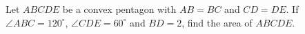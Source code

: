 Let $ABCDE$ be a convex pentagon with $AB=BC$ and $CD=DE$. If $\angle ABC=120^\circ$, $\angle CDE=60^\circ$ and $BD=2$, find the area of $ABCDE$.
